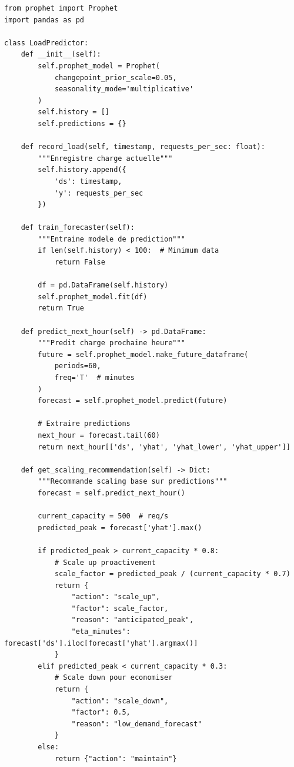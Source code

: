 \documentclass[12pt,a4paper]{article}
\begin{document}
\begin{lstlisting}[caption={Load Prediction Engine}]
from prophet import Prophet
import pandas as pd

class LoadPredictor:
    def __init__(self):
        self.prophet_model = Prophet(
            changepoint_prior_scale=0.05,
            seasonality_mode='multiplicative'
        )
        self.history = []
        self.predictions = {}
        
    def record_load(self, timestamp, requests_per_sec: float):
        """Enregistre charge actuelle"""
        self.history.append({
            'ds': timestamp,
            'y': requests_per_sec
        })
        
    def train_forecaster(self):
        """Entraine modele de prediction"""
        if len(self.history) < 100:  # Minimum data
            return False
            
        df = pd.DataFrame(self.history)
        self.prophet_model.fit(df)
        return True
        
    def predict_next_hour(self) -> pd.DataFrame:
        """Predit charge prochaine heure"""
        future = self.prophet_model.make_future_dataframe(
            periods=60, 
            freq='T'  # minutes
        )
        forecast = self.prophet_model.predict(future)
        
        # Extraire predictions
        next_hour = forecast.tail(60)
        return next_hour[['ds', 'yhat', 'yhat_lower', 'yhat_upper']]
        
    def get_scaling_recommendation(self) -> Dict:
        """Recommande scaling base sur predictions"""
        forecast = self.predict_next_hour()
        
        current_capacity = 500  # req/s
        predicted_peak = forecast['yhat'].max()
        
        if predicted_peak > current_capacity * 0.8:
            # Scale up proactivement
            scale_factor = predicted_peak / (current_capacity * 0.7)
            return {
                "action": "scale_up",
                "factor": scale_factor,
                "reason": "anticipated_peak",
                "eta_minutes": forecast['ds'].iloc[forecast['yhat'].argmax()]
            }
        elif predicted_peak < current_capacity * 0.3:
            # Scale down pour economiser
            return {
                "action": "scale_down",
                "factor": 0.5,
                "reason": "low_demand_forecast"
            }
        else:
            return {"action": "maintain"}
            

\end{lstlisting}
\end{document}

